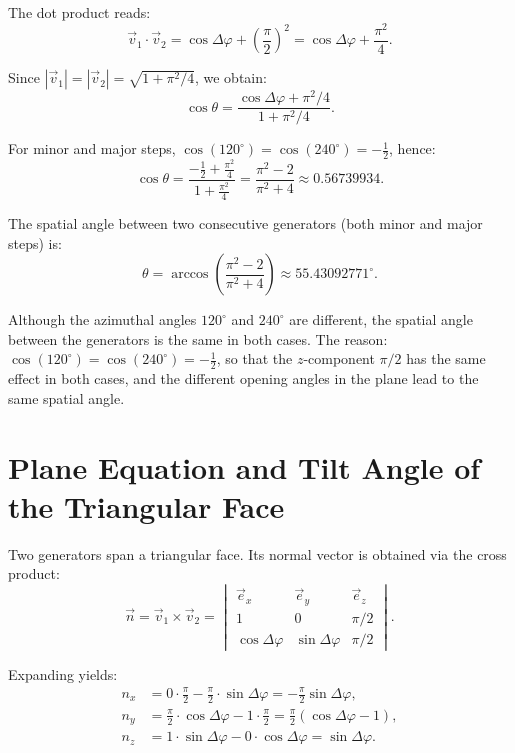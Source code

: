 The dot product reads:
\[
  \vec{v}_1 \cdot \vec{v}_2
  = \cos\Delta\varphi + \left(\frac{\pi}{2}\right)^2
  = \cos\Delta\varphi + \frac{\pi^2}{4}.
\]

Since $|\vec{v}_1| = |\vec{v}_2| = \sqrt{1+\pi^2/4}$, we obtain:
\[
  \cos\theta
  = \frac{\cos\Delta\varphi + \pi^2/4}{1 + \pi^2/4}.
\]

For minor and major steps, $\cos(120^\circ) = \cos(240^\circ) = -\tfrac{1}{2}$,
hence:
\[
  \cos\theta
  = \frac{-\tfrac{1}{2} + \tfrac{\pi^2}{4}}{1 + \tfrac{\pi^2}{4}}
  = \frac{\pi^2 - 2}{\pi^2 + 4}
  \approx 0.56739934.
\]

\begin{satz}
The spatial angle between two consecutive generators
(both minor and major steps) is:
\begin{equation}
  \theta = \arccos\!\left(\frac{\pi^2 - 2}{\pi^2 + 4}\right)
  \approx 55.43092771^\circ.
\end{equation}
\end{satz}

\begin{bemerkung}
Although the azimuthal angles $120^\circ$ and $240^\circ$ are different, the
spatial angle between the generators is the same in both cases.
The reason: $\cos(120^\circ) = \cos(240^\circ) = -\tfrac{1}{2}$, so that
the $z$-component $\pi/2$ has the same effect in both cases,
and the different opening angles in the plane lead to the same
spatial angle.
\end{bemerkung}

\section{Plane Equation and Tilt Angle of the Triangular Face}

Two generators span a triangular face. Its
normal vector is obtained via the cross product:
\[
  \vec{n}
  = \vec{v}_1 \times \vec{v}_2
  = \begin{vmatrix}\vec{e}_x & \vec{e}_y & \vec{e}_z\\
      1 & 0 & \pi/2\\
      \cos\Delta\varphi & \sin\Delta\varphi & \pi/2
    \end{vmatrix}.
\]

Expanding yields:
\begin{align*}
  n_x &= 0\cdot\tfrac{\pi}{2} - \tfrac{\pi}{2}\cdot\sin\Delta\varphi
       = -\frac{\pi}{2}\sin\Delta\varphi, \\
  n_y &= \tfrac{\pi}{2}\cdot\cos\Delta\varphi - 1\cdot\tfrac{\pi}{2}
       = \frac{\pi}{2}(\cos\Delta\varphi - 1), \\
  n_z &= 1\cdot\sin\Delta\varphi - 0\cdot\cos\Delta\varphi
       = \sin\Delta\varphi.
\end{align*}

